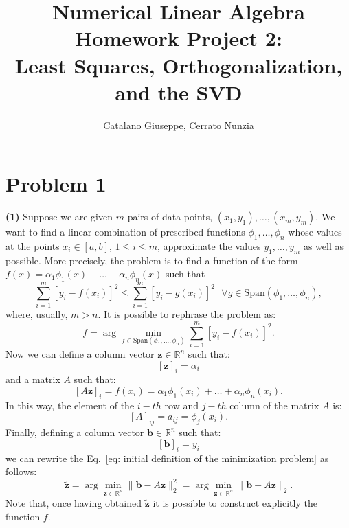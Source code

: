 \documentclass[a4paper,11pt]{article}
\newcommand{\R}{\mathbb{R}}
\begin{document}
\author{Catalano Giuseppe, Cerrato Nunzia}
\title{Numerical Linear Algebra Homework Project 2:\\Least Squares, Orthogonalization, and the SVD}
\date{}
\maketitle

\section*{Problem 1}
\textbf{(1)} Suppose we are given $m$ pairs of data points, $(x_1,y_1),\dots,(x_m,y_m)$. We want to find a linear combination of prescribed functions $\phi_1, \dots, \phi_n$ whose values at the points $x_i \in [a,b] $, $1\le i \le m$, approximate the values $y_1,\dots, y_m$ as well as possible. More precisely, the problem is to find a function of the form $f(x) = \alpha_1 \phi_1(x) + \dots + \alpha_n \phi_n(x) $ such that 
\begin{equation}
	\sum_{i=1}^{m} \left[ y_i - f(x_i) \right]^2 \le \sum_{i=1}^{m} \left[ y_i - g(x_i) \right]^2\ \ \ \forall g \in \text{Span}(\phi_1,\dots,\phi_n),
\end{equation}
where, usually, $m>n$. It is possible to rephrase the problem as:
\begin{equation}\label{eq: initial definition of the minimization problem}
	f = \arg \min_{f\in \text{Span}(\phi_1,\dots,\phi_n)} \sum_{i=1}^{m} \left[ y_i - f(x_i) \right]^2.
\end{equation}
Now we can define a column vector $\textbf{z} \in \R^n$ such that:
\begin{equation}\label{key}
	[\textbf{z}]_i = \alpha_i
\end{equation}
and a matrix $A$ such that:
\begin{equation}\label{key}
	[A\textbf{z}]_i = f(x_i) = \alpha_1 \phi_1(x_i) + \dots + \alpha_n \phi_n(x_i).
\end{equation}
In this way, the element of the $i-th$ row and $j-th$ column of the matrix $A$ is:
\begin{equation}\label{key}
	[A]_{ij} = a_{ij} = \phi_j(x_i).
\end{equation}
Finally, defining a column vector $\textbf{b} \in \R^n$ such that:
\begin{equation}\label{key}
	[\textbf{b}]_i = y_i
\end{equation}
we can rewrite the Eq.~\eqref{eq: initial definition of the minimization problem} as follows:
\begin{equation}\label{key}
	\tilde{\textbf{z}} = \arg \min_{\textbf{z}\in \R^n} \lVert \textbf{b} - A \textbf{z} \rVert_2^2 =  \arg \min_{\textbf{z}\in \R^n} \lVert \textbf{b} - A \textbf{z} \rVert_2.
\end{equation}
Note that, once having obtained $\tilde{\textbf{z}}$ it is possible to construct explicitly the function $f$.\\
\end{document}
